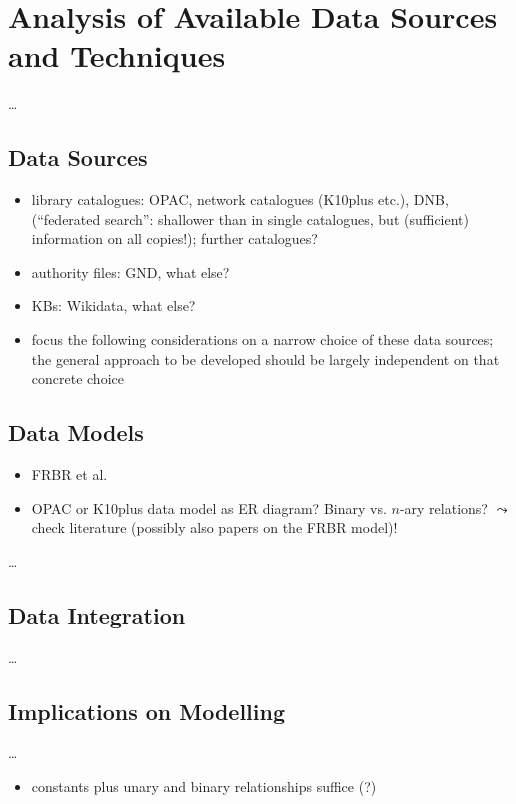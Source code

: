 \chapter{Analysis of Available Data Sources and Techniques}
\label{chap:analysis}

\dots

\section{Data Sources}
\label{sec:data_sources}

\begin{itemize}
  \item
    library catalogues: OPAC, network catalogues (K10plus etc.), DNB,
     (\enquote{federated search}: shallower than in single catalogues,
    but (sufficient) information on all copies!);
    further catalogues?
  \item
    authority files: GND, what else?
  \item
    KBs: Wikidata, what else?
  \item
    focus the following considerations on a narrow choice of these data sources;
    the general approach to be developed should be largely independent on that concrete choice
\end{itemize}

\section{Data Models}
\label{sec:data_models}

\begin{itemize}
  \item
    FRBR et al.
  \item 
    OPAC or K10plus data model as ER diagram? Binary vs. $n$-ary relations?
    $\leadsto$ check literature (possibly also papers on the FRBR model)!
\end{itemize}

\dots

\section{Data Integration}
\label{sec:data_integration}

\dots

\section{Implications on Modelling}
\label{sec:implications_on_modelling}

\dots

\begin{itemize}
  \item
    constants plus unary and binary relationships suffice (?)
\end{itemize}


